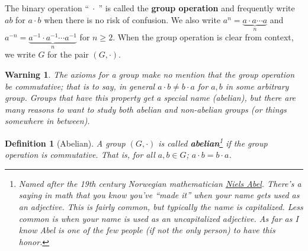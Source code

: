 \documentclass[12pt]{article}
\numberwithin{equation}{subsection}
\newtheorem{defn}[subsection]{Definition}
\theoremstyle{note}
\newtheorem{warning}[subsection]{Warning}
\begin{document}
The binary operation ``$\;\cdot\;$'' is called the \textbf{group operation} and frequently write $ab$ for $a\cdot b$ when there is no risk of confusion. We also write $a^n=\underbrace{a\cdot a\cdots a}_n$ and $a^{-n}=\underbrace{a^{-1}\cdot a^{-1}\cdots a^{-1}}_n $ for $n\geq 2$. When the group operation is clear from context, we write $G$ for the pair $(G,\cdot)$. 

\begin{warning} The axioms for a group make no mention that the group operation be commutative; that is to say, in general $a\cdot b\neq b\cdot a$ for $a,b$ in some arbitrary group. Groups that have this property get a special name (abelian), but there are many reasons to want to study both abelian and non-abelian groups (or things somewhere in between). 
\end{warning}

\begin{defn}[Abelian]
A group $(G,\cdot)$ is called \textbf{abelian}\footnote{Named after the 19th century Norwegian mathematician \href{https://en.wikipedia.org/wiki/Niels_Henrik_Abel}{Niels Abel}. There's a saying in math that you know you've ``made it'' when your name gets used as an adjective. This is fairly common, but typically the name is capitalized. Less common is when your name is used as an \textit{uncapitalized} adjective. As far as I know Abel is one of the few people (if not the only person) to have this honor.} if the group operation is commutative. That is, for all $a,b\in G$; $a\cdot b=b\cdot a$.
\end{defn}
\end{document}
